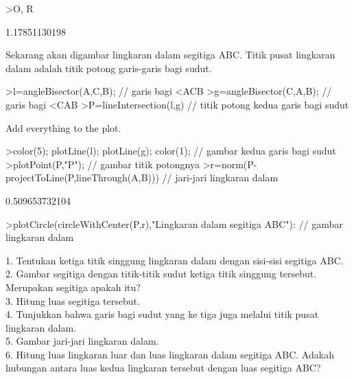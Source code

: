 \documentclass[a4paper,10pt]{article}
\begin{document}
\begin{eulernotebook}
\begin{eulerprompt}
>O, R
\end{eulerprompt}
\begin{euleroutput}
  [1.16667,  1.16667]
  1.17851130198
\end{euleroutput}
\begin{eulercomment}
Sekarang akan digambar lingkaran dalam segitiga ABC. Titik pusat lingkaran dalam adalah
titik potong garis-garis bagi sudut.
\end{eulercomment}
\begin{eulerprompt}
>l=angleBisector(A,C,B); // garis bagi <ACB
>g=angleBisector(C,A,B); // garis bagi <CAB
>P=lineIntersection(l,g) // titik potong kedua garis bagi sudut
\end{eulerprompt}
\begin{euleroutput}
  [0.86038,  0.86038]
\end{euleroutput}
\begin{eulercomment}
Add everything to the plot.
\end{eulercomment}
\begin{eulerprompt}
>color(5); plotLine(l); plotLine(g); color(1); // gambar kedua garis bagi sudut
>plotPoint(P,"P"); // gambar titik potongnya
>r=norm(P-projectToLine(P,lineThrough(A,B))) // jari-jari lingkaran dalam
\end{eulerprompt}
\begin{euleroutput}
  0.509653732104
\end{euleroutput}
\begin{eulerprompt}
>plotCircle(circleWithCenter(P,r),"Lingkaran dalam segitiga ABC"): // gambar lingkaran dalam 
\end{eulerprompt}
\begin{eulercomment}
1. Tentukan ketiga titik singgung lingkaran dalam dengan sisi-sisi
segitiga ABC.\\
2. Gambar segitiga dengan titik-titik sudut ketiga titik singgung
tersebut. Merupakan segitiga apakah itu?\\
3. Hitung luas segitiga tersebut.\\
4. Tunjukkan bahwa garis bagi sudut yang ke tiga juga melalui titik
pusat lingkaran dalam.\\
5. Gambar jari-jari lingkaran dalam.\\
6. Hitung luas lingkaran luar dan luas lingkaran dalam segitiga ABC.
Adakah hubungan antara luas kedua lingkaran tersebut dengan luas
segitiga ABC?
\end{eulercomment}
\begin{eulerprompt}

\end{eulerprompt}
\end{eulernotebook}
\end{document}
